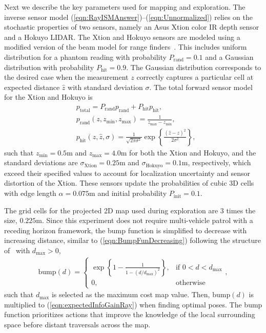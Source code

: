\documentclass[smallextended]{svjour3}       %
\newcommand{\braces}[1]{\ensuremath{\left\{ #1 \right\}}}
\newcommand{\refeqn}[1]{(\ref{eqn:#1})}
\begin{document}
Next we describe the key parameters used for mapping and exploration. The inverse sensor model \refeqn{RayISMAnswer}--\refeqn{Unnormalized} relies on the stochastic properties of two sensors, namely an Asus Xtion color IR depth sensor and a Hokuyo LIDAR. The Xtion and Hokuyo sensors are modeled using a modified version of the beam model for range finders~\cite{ThrBurFox05}. This includes uniform distribution for a phantom reading with probability $P_\text{rand}=0.1$ and a Gaussian distribution with probability $P_\text{hit}=0.9$. The Gaussian distribution corresponds to the desired case when the measurement $z$ correctly captures a particular cell at expected distance $\hat{z}$ with standard deviation $\sigma$. The total forward sensor model for the Xtion and Hokuyo is
\begin{align}
&p_\text{total}=P_\text{rand}p_\text{rand}+P_\text{hit}p_\text{hit},
\\
&p_\text{rand}(z,z_\text{min},z_\text{max})=\frac1{z_\text{max}-z_\text{min}},
\\
&p_\text{hit}(z,\hat{z},\sigma)=\frac1{\sqrt{2\pi\sigma^2}}\exp\braces{\frac{(\hat{z}-z)^2}{{2\sigma^2}}},
\end{align}
such that $z_\text{min}=0.5$m and $z_\text{max}=4.0$m for both the Xtion and Hokuyo, and the standard deviations are $\sigma_\text{Xtion}=0.25$m and $\sigma_\text{Hokuyo}=0.1$m, respectively, which exceed their specified values to account for localization uncertainty and sensor distortion of the Xtion. These sensors update the probabilities of cubic 3D cells with edge length $\alpha=0.075$m and initial probability $P_\text{init}=0.1$.

The grid cells for the projected 2D map used during exploration are $3$ times the size, $0.225$m. Since this experiment does not require multi-vehicle patrol with a receding horizon framework, the bump function is simplified to decrease with increasing distance, similar to \refeqn{BumpFunDecreasing} following the structure of~\cite{Joh06} with $d_\text{max}>0$,
\begin{align}
\label{eqn:BumpFunRef}
\text{bump}(d)= 
\begin{cases}
    \exp\braces{{1-\frac1{1-(d/d_\text{max})^2}}},			& \text{if }0<d<d_\text{max}\\
    0,              				& \text{otherwise}
\end{cases},
\end{align}
such that $d_\text{max}$ is selected as the maximum cost map value. Then, $\text{bump}(d)$ is multiplied to \refeqn{expectedInfoGainRay} when finding optimal poses. The bump function prioritizes actions that improve the knowledge of the local surrounding space before distant traversals across the map.
\end{document}
